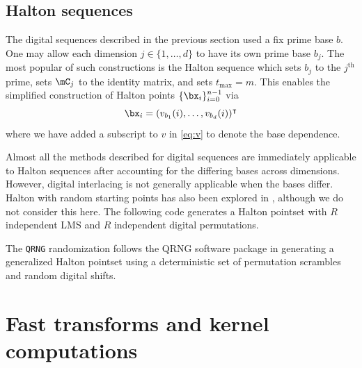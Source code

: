 \documentclass[acmsmall]{acmart}
\begin{document}
\subsection{Halton sequences}

The digital sequences described in the previous section used a fix prime base $b$. One may allow each dimension $j \in \{1,\dots,d\}$ to have its own prime base $b_j$. The most popular of such constructions is the Halton sequence which sets $b_j$ to the $j^\mathrm{th}$ prime, sets $\mC_j$ to the identity matrix, and sets $t_\mathrm{max} = m$. This enables the simplified construction of Halton points $\{\bx_i\}_{i=0}^{n-1}$ via
$$\bx_i = (v_{b_1}(i),\dots,v_{b_d}(i))^\intercal$$
where we have added a subscript to $v$ in \eqref{eq:v} to denote the base dependence. 

Almost all the methods described for digital sequences are immediately applicable to Halton sequences after accounting for the differing bases across dimensions. However, digital interlacing is not generally applicable when the bases differ. Halton with random starting points has also been explored in \citep{wang2000randomized}, although we do not consider this here.
The following code generates a Halton pointset with $R$ independent LMS and $R$ independent digital permutations.

The \texttt{QRNG} randomization follows the QRNG software package \citep{qrng.software} in generating a generalized Halton pointset \citep{faure2009generalized} using a deterministic set of  permutation scrambles and random digital shifts. 

\section{Fast transforms and kernel computations} \label{sec:fast_transforms}
\end{document}
